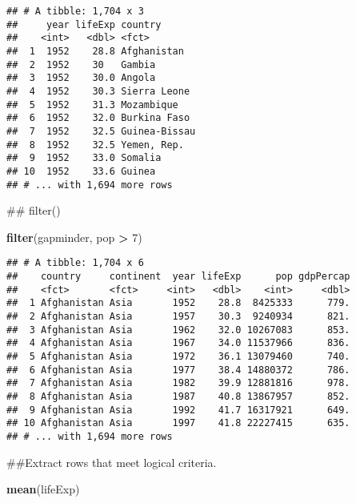 \documentclass[]{article}
\newenvironment{Shaded}{\begin{snugshade}}{\end{snugshade}}
\newcommand{\DecValTok}[1]{\textcolor[rgb]{0.00,0.00,0.81}{#1}}
\newcommand{\KeywordTok}[1]{\textcolor[rgb]{0.13,0.29,0.53}{\textbf{#1}}}
\newcommand{\NormalTok}[1]{#1}
\newcommand{\OperatorTok}[1]{\textcolor[rgb]{0.81,0.36,0.00}{\textbf{#1}}}
\newcommand{\StringTok}[1]{\textcolor[rgb]{0.31,0.60,0.02}{#1}}
\begin{document}
\begin{verbatim}
## # A tibble: 1,704 x 3
##     year lifeExp country      
##    <int>   <dbl> <fct>        
##  1  1952    28.8 Afghanistan  
##  2  1952    30   Gambia       
##  3  1952    30.0 Angola       
##  4  1952    30.3 Sierra Leone 
##  5  1952    31.3 Mozambique   
##  6  1952    32.0 Burkina Faso 
##  7  1952    32.5 Guinea-Bissau
##  8  1952    32.5 Yemen, Rep.  
##  9  1952    33.0 Somalia      
## 10  1952    33.6 Guinea       
## # ... with 1,694 more rows
\end{verbatim}

\begin{Shaded}
\begin{Highlighting}[]
\NormalTok{## filter()}

\KeywordTok{filter}\NormalTok{(gapminder, pop }\OperatorTok{>}\StringTok{ }\DecValTok{7}\NormalTok{)}
\end{Highlighting}
\end{Shaded}

\begin{verbatim}
## # A tibble: 1,704 x 6
##    country     continent  year lifeExp      pop gdpPercap
##    <fct>       <fct>     <int>   <dbl>    <int>     <dbl>
##  1 Afghanistan Asia       1952    28.8  8425333      779.
##  2 Afghanistan Asia       1957    30.3  9240934      821.
##  3 Afghanistan Asia       1962    32.0 10267083      853.
##  4 Afghanistan Asia       1967    34.0 11537966      836.
##  5 Afghanistan Asia       1972    36.1 13079460      740.
##  6 Afghanistan Asia       1977    38.4 14880372      786.
##  7 Afghanistan Asia       1982    39.9 12881816      978.
##  8 Afghanistan Asia       1987    40.8 13867957      852.
##  9 Afghanistan Asia       1992    41.7 16317921      649.
## 10 Afghanistan Asia       1997    41.8 22227415      635.
## # ... with 1,694 more rows
\end{verbatim}

\begin{Shaded}
\begin{Highlighting}[]
\NormalTok{##Extract rows that meet logical criteria. }
\end{Highlighting}
\end{Shaded}

\begin{Shaded}
\begin{Highlighting}[]
\KeywordTok{mean}\NormalTok{(lifeExp) }
\end{Highlighting}
\end{Shaded}
\end{document}
